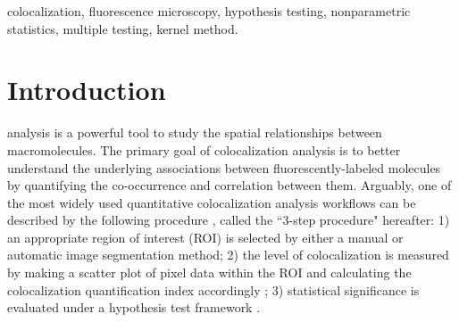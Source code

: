 \documentclass[10pt,twocolumn,twoside]{IEEEtran}
\begin{document}
\begin{IEEEkeywords}
colocalization, fluorescence microscopy, hypothesis testing, nonparametric statistics, multiple testing, kernel method.
\end{IEEEkeywords}





%
\IEEEpeerreviewmaketitle



\section{Introduction}
% 
% 
% 
% 

 analysis is a powerful tool to study the spatial relationships between macromolecules. The primary goal of colocalization analysis is to better understand the underlying associations between fluorescently-labeled molecules by quantifying the co-occurrence and correlation between them. Arguably, one of the most widely used quantitative colocalization analysis workflows can be described by the following procedure \citep[see][]{dunn2011}, called the ``3-step procedure" hereafter: 1) an appropriate region of interest (ROI) is selected by either a manual or automatic image segmentation method; 2) the level of colocalization is measured by making a scatter plot of pixel data within the ROI and calculating the colocalization quantification index accordingly \citep[see][]{manders1992dynamics,manders1993measurement,Li04,Khanna06,Helmuth2010,lagache2013statistical}; 3) statistical significance is evaluated under a hypothesis test framework \citep[see][]{costes2004}. 
\end{document}
